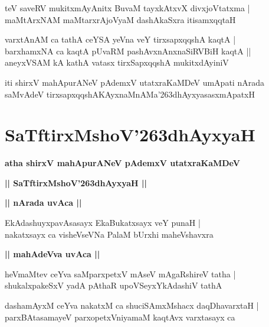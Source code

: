 \documentclass[twoside,12pt,openright]{book}
\def\S{\char'263}
\newcounter{shloka}[chapter]
\def\uvaca#1{\centerline{{\large\textbf{#1}}}}
\begin{document}
\begin{shloka}%
teV saveRV mukitxmAyAnitx BuvaM tayxkAtxvX divxjoVtatxma |\\
maMtArxNAM maMtarxrAjoVyaM dashAkaSxra itisamxqqtaH 
\end{shloka}

\begin{shloka}%
varxtAnAM ca tathA ceYSA yeVna veY tirxsapxqqshA kaqtA |\\
barxhamxNA ca kaqtA pUvaRM pashAvxnAnxnaSiRVBiH kaqtA ||\\
aneyxVSAM kA kathA vatasx tirxSapxqqshA mukitxdAyiniV
\end{shloka}

\begin{center}
iti shirxV mahApurANeV pAdemxV utatxraKaMDeV umApati nArada saMvAdeV  
tirxsapxqqshAKAyxnaMnAMa\S dhAyxyasasxmApatxH 
\end{center}

\chapter{SaTftirxMshoV\S dhAyxyaH}

\begin{center}
{\LARGE\bfseries atha shirxV mahApurANeV pAdemxV utatxraKaMDeV}
\end{center}

\begin{center}
{\LARGE\bfseries || SaTftirxMshoV\S dhAyxyaH ||}
\end{center}

\uvaca{|| nArada uvAca ||}

\begin{shloka}%
EkAdashuyxpavAsasayx EkaBukatxsayx veY punaH |\\
nakatxsayx ca visheVseVNa PalaM bUrxhi maheVshavxra
\end{shloka}

\uvaca{|| mahAdeVva uvAca ||}

\begin{shloka}%
heVmaMtev ceYva saMparxpetxV mAseV mAgaRshireV tatha |\\
shukalxpakeSxV yadA pAthaR upoVSeyxYkAdashiV tathA 
\end{shloka}

\begin{shloka}%
dashamAyxM ceYva nakatxM ca shuciSAmxMshacx daqDhavarxtaH |\\
parxBAtasamayeV parxopetxVniyamaM kaqtAvx varxtasayx ca 
\end{shloka}
\end{document}
